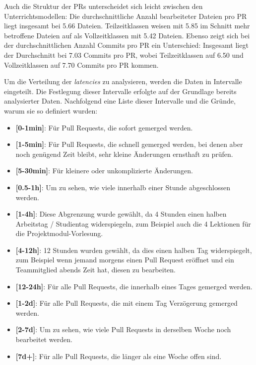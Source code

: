 Auch die Struktur der PRs unterscheidet sich leicht zwischen den Unterrichtsmodellen: Die durchschnittliche Anzahl bearbeiteter Dateien pro PR liegt insgesamt bei 5.66 Dateien. Teilzeitklassen weisen mit 5.85 im Schnitt mehr betroffene Dateien auf als Vollzeitklassen mit 5.42 Dateien. Ebenso zeigt sich bei der durchschnittlichen Anzahl Commits pro PR ein Unterschied: Insgesamt liegt der Durchschnitt bei 7.03 Commits pro PR, wobei Teilzeitklassen auf 6.50 und Vollzeitklassen auf 7.70 Commits pro PR kommen.

Um die Verteilung der \textit{latencies} zu analysieren, werden die Daten in Intervalle eingeteilt. Die Festlegung dieser Intervalle erfolgte auf der Grundlage bereits analysierter Daten. Nachfolgend eine Liste dieser Intervalle und die Gründe, warum sie so definiert wurden: 

\begin{itemize}
    \item \textbf{[0-1min]}: Für Pull Requests, die sofort gemerged werden.
    \item \textbf{[1-5min]}: Für Pull Requests, die schnell gemerged werden, bei denen aber noch genügend Zeit bleibt, sehr kleine Änderungen ernsthaft zu prüfen.
    \item \textbf{[5-30min]}: Für kleinere oder unkomplizierte Änderungen.
    \item \textbf{[0.5-1h]}: Um zu sehen, wie viele innerhalb einer Stunde abgeschlossen werden.
    \item \textbf{[1-4h]}: Diese Abgrenzung wurde gewählt, da 4 Stunden einen halben Arbeitstag / Studientag widerspiegeln, zum Beispiel auch die 4 Lektionen für die Projektmodul-Vorlesung.
    \item \textbf{[4-12h]}: 12 Stunden wurden gewählt, da dies einen halben Tag widerspiegelt, zum Beispiel wenn jemand morgens einen Pull Request eröffnet und ein Teammitglied abends Zeit hat, diesen zu bearbeiten.
    \item \textbf{[12-24h]}: Für alle Pull Requests, die innerhalb eines Tages gemerged werden.
    \item \textbf{[1-2d]}: Für alle Pull Requests, die mit einem Tag Verzögerung gemerged werden.
    \item \textbf{[2-7d]}: Um zu sehen, wie viele Pull Requests in derselben Woche noch bearbeitet werden.
    \item \textbf{[7d+]}: Für alle Pull Requests, die länger als eine Woche offen sind.
\end{itemize}


